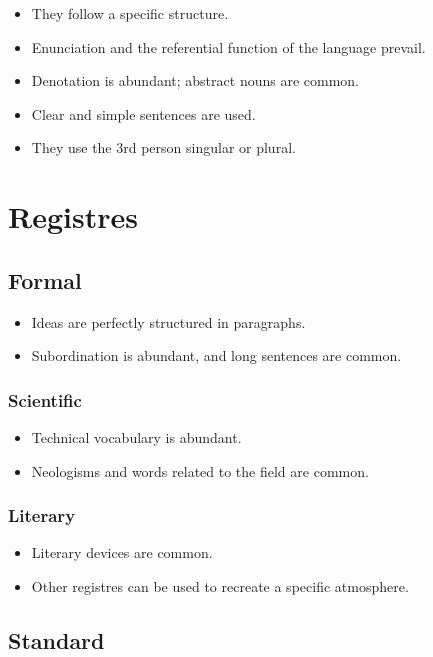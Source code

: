 \documentclass{article}
\begin{document}
\begin{itemize}
    \item They follow a specific structure.
    \item Enunciation and the referential function of the language prevail.
    \item Denotation is abundant; abstract nouns are common.
    \item Clear and simple sentences are used.
    \item They use the 3rd person singular or plural.
\end{itemize}

\section*{Registres}

\subsection*{Formal}

\begin{itemize}
    \item Ideas are perfectly structured in paragraphs.
    \item Subordination is abundant, and long sentences are common.
\end{itemize}

\subsubsection*{Scientific}

\begin{itemize}
    \item Technical vocabulary is abundant.
    \item Neologisms and words related to the field are common.
\end{itemize}

\subsubsection*{Literary}

\begin{itemize}
    \item Literary devices are common.
    \item Other registres can be used to recreate a specific atmosphere.
\end{itemize}

\subsection*{Standard}
\end{document}
